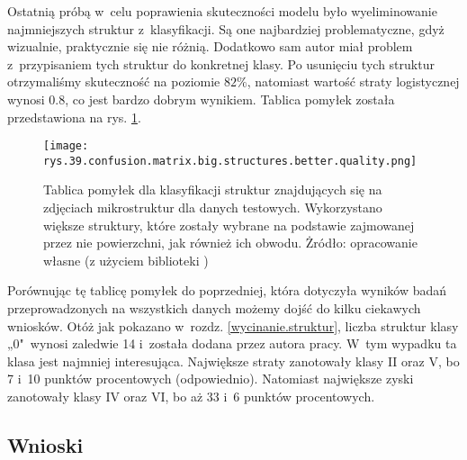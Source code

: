 Ostatnią próbą w~celu poprawienia skuteczności modelu było wyeliminowanie najmniejszych struktur z~klasyfikacji. Są one najbardziej problematyczne, gdyż wizualnie, praktycznie się nie różnią. Dodatkowo sam autor miał problem z~przypisaniem tych struktur do konkretnej klasy. Po usunięciu tych struktur otrzymaliśmy skuteczność na poziomie $82\%$, natomiast wartość straty logistycznej wynosi $0.8$, co jest bardzo dobrym wynikiem. Tablica pomyłek została przedstawiona na rys. \ref{rys.39.confusion.matrix.big.structures.png}. 
\begin{figure}[h]
    \centering
    \texttt{[image: rys.39.confusion.matrix.big.structures.better.quality.png]}  %
    \caption{Tablica pomyłek dla klasyfikacji struktur znajdujących się na zdjęciach mikrostruktur dla danych testowych. Wykorzystano większe struktury, które zostały wybrane na podstawie zajmowanej przez nie powierzchni, jak również ich obwodu. Żródło: opracowanie własne (z użyciem biblioteki )}
    \label{rys.39.confusion.matrix.big.structures.png}
\end{figure}
Porównując tę tablicę pomyłek do poprzedniej, która dotyczyła wyników badań przeprowadzonych na wszystkich danych możemy dojść do kilku ciekawych wniosków. Otóż jak pokazano w~rozdz. \ref{wycinanie.struktur}, liczba struktur klasy „0"~wynosi zaledwie 14 i~została dodana przez autora pracy. W~tym wypadku ta klasa jest najmniej interesująca. 
Największe straty zanotowały klasy II oraz V, bo 7 i~10 punktów procentowych (odpowiednio). Natomiast największe zyski zanotowały klasy IV oraz VI, bo aż 33 i~6 punktów procentowych.

\subsection{Wnioski}
\label{klasyfikacja.struktur.wnioski}


